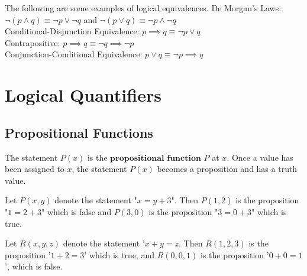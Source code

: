 \documentclass{article}
\newtheorem{definition}{Definition}[subsection]
\newtheorem{remark}{Remark}[subsection]
\newtheorem{example}{Example}[subsection]
\begin{document}
\begin{tcolorbox}
[colback=cyan!5!white,colframe=cyan!75!black,title=\begin{remark}
\end{remark}]
The following are some examples of logical equivalences.
De Morgan's Laws: $\neg (p\wedge q)\equiv \neg p\lor \neg q$ and $\neg(p\lor q)\equiv \neg p\wedge \neg q$\\
Conditional-Disjunction Equivalence: $p\implies q\equiv \neg p\lor q$\\
Contrapositive: $p\implies q\equiv \neg q\implies \neg p$\\
Conjunction-Conditional Equivalence: $p\lor q\equiv\neg p\implies q$
\end{tcolorbox}
\section{Logical Quantifiers}
\subsection{Propositional Functions}
\begin{tcolorbox}
[colback=blue!5!white,colframe=blue!75!black,title=\begin{definition}
\end{definition}]
The statement $P(x)$ is the $\textbf{propositional function}$ $P$ at $x$. Once a value has been assigned to $x$, the statement $P(x)$ becomes a proposition and has a truth value.
\end{tcolorbox}
\begin{tcolorbox}
[colback=red!5!white,colframe=red!75!black,title=\begin{example}
\end{example}]
Let $P(x,y)$ denote the statement "$x=y+3$". Then $P(1,2)$ is the proposition "$1=2+3$" which is false and $P(3,0)$ is the proposition "$3=0+3$" which is true.
\end{tcolorbox}
\begin{tcolorbox}
[colback=red!5!white,colframe=red!75!black,title=\begin{example}
\end{example}]
Let $R(x,y,z)$ denote the statement '$x+y=z$. Then $R(1,2,3)$ is the proposition '$1+2=3$' which is true, and $R(0,0,1)$ is the proposition '$0+0=1$', which is false.
\end{tcolorbox}
\end{document}
